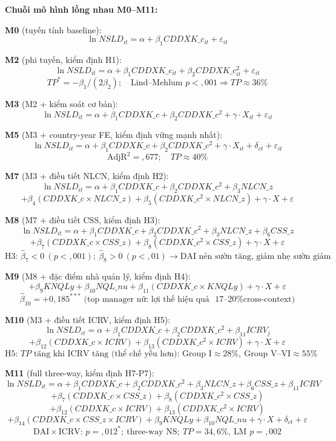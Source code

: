 \documentclass[12pt,a4paper]{article}
\begin{document}
\textbf{Chuỗi mô hình lồng nhau M0--M11:}

\textbf{M0} (tuyến tính baseline):
\[\ln NSLD_{it} = \alpha + \beta_1 CDDXK\_c_{it} + \varepsilon_{it}\]

\textbf{M2} (phi tuyến, kiểm định H1):
\[\ln NSLD_{it} = \alpha + \beta_1 CDDXK\_c_{it} + \beta_2 CDDXK\_c^2_{it} + \varepsilon_{it}\]
\[TP^* = -\beta_1 / (2\beta_2); \quad \text{Lind–Mehlum } p < {,}001 \Rightarrow TP \approx 36\%\]

\textbf{M3} (M2 + kiểm soát cơ bản):
\[\ln NSLD_{it} = \alpha + \beta_1 CDDXK\_c + \beta_2 CDDXK\_c^2 + \gamma \cdot X_{it} + \varepsilon_{it}\]

\textbf{M5} (M3 + country-year FE, kiểm định vững mạnh nhất):
\[\ln NSLD_{it} = \alpha + \beta_1 CDDXK\_c + \beta_2 CDDXK\_c^2 + \gamma \cdot X_{it} + \delta_{ct} + \varepsilon_{it}\]
\[\text{AdjR}^2 = {,}677; \quad TP \approx 40\%\]

\textbf{M7} (M3 + điều tiết NLCN, kiểm định H2):
\[\ln NSLD_{it} = \alpha + \beta_1 CDDXK\_c + \beta_2 CDDXK\_c^2 + \beta_3 NLCN\_z\]
\[+ \beta_4 (CDDXK\_c \times NLCN\_z) + \beta_5 (CDDXK\_c^2 \times NLCN\_z) + \gamma \cdot X + \varepsilon\]

\textbf{M8} (M7 + điều tiết CSS, kiểm định H3):
\[\ln NSLD_{it} = \alpha + \beta_1 CDDXK\_c + \beta_2 CDDXK\_c^2 + \beta_3 NLCN\_z + \beta_6 CSS\_z\]
\[+ \beta_7 (CDDXK\_c \times CSS\_z) + \beta_8 (CDDXK\_c^2 \times CSS\_z) + \gamma \cdot X + \varepsilon\]
\[\text{H3: } \hat\beta_7 < 0\ (p < {,}001);\ \hat\beta_8 > 0\ (p < {,}01) \rightarrow \text{DAI nén sườn tăng, giảm nhẹ sườn giảm}\]

\textbf{M9} (M8 + đặc điểm nhà quản lý, kiểm định H4):
\[+ \beta_9 KNQLy + \beta_{10} NQL\_nu + \beta_{11}(CDDXK\_c \times KNQLy) + \gamma \cdot X + \varepsilon\]
\[\hat\beta_{10} = +0{,}185^{***} \text{ (top manager nữ: lợi thế hiệu quả ~17–20\% cross-context)}\]

\textbf{M10} (M3 + điều tiết ICRV, kiểm định H5):
\[\ln NSLD_{it} = \alpha + \beta_1 CDDXK\_c + \beta_2 CDDXK\_c^2 + \beta_{11} ICRV_j\]
\[+ \beta_{12}(CDDXK\_c \times ICRV) + \beta_{13}(CDDXK\_c^2 \times ICRV) + \gamma \cdot X + \varepsilon\]
\[\text{H5: } TP \text{ tăng khi ICRV tăng (thể chế yếu hơn): Group I} \approx 28\%,\ \text{Group V–VI} \approx 55\%\]

\textbf{M11} (full three-way, kiểm định H7-P7):
\[\ln NSLD_{it} = \alpha + \beta_1 CDDXK\_c + \beta_2 CDDXK\_c^2 + \beta_3 NLCN\_z + \beta_6 CSS\_z + \beta_{11} ICRV\]
\[+ \beta_{7}(CDDXK\_c \times CSS\_z) + \beta_{8}(CDDXK\_c^2 \times CSS\_z)\]
\[+ \beta_{12}(CDDXK\_c \times ICRV) + \beta_{13}(CDDXK\_c^2 \times ICRV)\]
\[+ \beta_{14}(CDDXK\_c \times CSS\_z \times ICRV) + \beta_9 KNQLy + \beta_{10} NQL\_nu + \gamma \cdot X + \delta_{ct} + \varepsilon\]
\[\text{DAI} \times \text{ICRV: } p = {,}012^*;\ \text{three-way NS};\ TP = 34{,}6\%,\ \text{LM } p = {,}002\]
\end{document}
